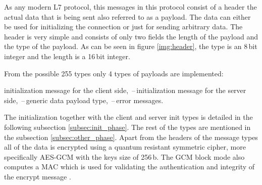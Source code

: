 As any modern L7 protocol, this messages in this protocol consist of a header the actual data that is being sent also referred to as a payload. The data can either be used for initializing the connection or just for sending arbitrary data. The header is very simple and consists of only two fields the length of the payload and the type of the payload. As can be seen in figure \ref{img:header}, the type is an 8\,bit integer and the length is a 16\,bit integer.

\noindent From the possible 255 types only 4 types of payloads are implemented:
\begin{itemize}
  initialization message for the client side,
  \,--\,initialization message for the server side,
  \,--\,generic data payload type,
  \,--\,error messages.
\end{itemize}
The initialization together with the client and server init types is detailed in the following subsection \ref{subsec:init_phase}. The rest of the types are mentioned in the subsection \ref{subsec:other_phase}. Apart from the headers of the message types all of the data is encrypted using a quantum resistant symmetric cipher, more specifically AES-GCM with the keys size of 256\,b. The GCM block mode also computes a MAC which is used for validating the authentication and integrity of the encrypt message \cite{Paar2010}.
